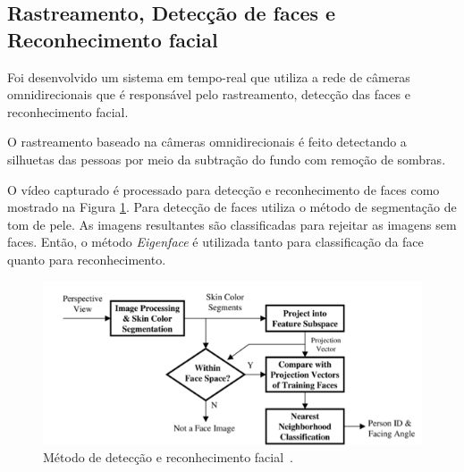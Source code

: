 \subsection{Rastreamento, Detecção de faces e Reconhecimento facial}
 
Foi desenvolvido um sistema em tempo-real que utiliza a rede de câmeras omnidirecionais que é responsável pelo rastreamento, detecção das faces e reconhecimento facial. 

O rastreamento baseado na câmeras omnidirecionais é feito detectando a silhuetas das pessoas por meio da subtração do fundo com remoção de sombras.

O vídeo capturado é processado para detecção e reconhecimento de faces como mostrado na Figura \ref{facerec}. Para detecção de faces utiliza o método de segmentação de tom de pele. As imagens resultantes são classificadas para rejeitar as imagens sem faces. Então, o método \textit{Eigenface} é utilizada tanto para classificação da face quanto para reconhecimento. 

	\begin{figure}[hbt]
		\begin{center}
			\includegraphics[scale=0.8]{figuras/3.TrabalhosCorrelatos/facerec.png}
		\end{center}
		\caption{Método de detecção e reconhecimento facial~\cite{trivedi}.}
		\label{facerec}
	\end{figure}














































